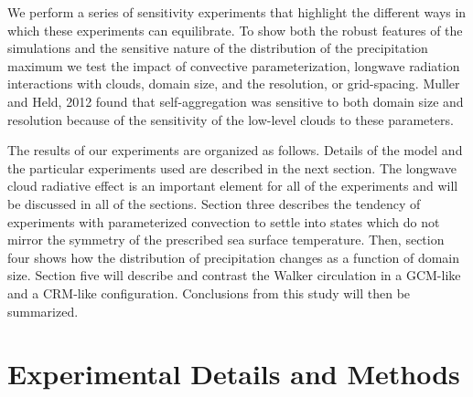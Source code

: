 \documentclass[draft]{agujournal2019}
\begin{document}
We perform a series of sensitivity experiments that highlight the different ways in which these experiments can equilibrate.  To 
show both the robust features of the simulations and the sensitive nature of the distribution of the precipitation maximum 
we test the impact of convective parameterization, 
longwave radiation interactions with clouds, domain size, 
and the resolution, or grid-spacing.    Muller and Held, 2012 found that self-aggregation was sensitive to both domain 
size and resolution because of the sensitivity of the low-level clouds to these parameters.  %

The results of our experiments are organized as follows.  Details of the model and the particular experiments used are described
in the next section.  The longwave cloud radiative effect is an important element for all of the experiments and will be 
discussed in all of the sections.   
Section three describes the tendency of experiments with parameterized convection to settle into states which 
do not mirror the symmetry of the prescribed sea surface temperature.   
Then, section four shows how the distribution of precipitation changes as a function of domain size.  
Section five will describe and contrast the Walker circulation in a GCM-like and a CRM-like configuration. 
Conclusions from this study will then be summarized.  

\section{Experimental Details and Methods}
\end{document}

